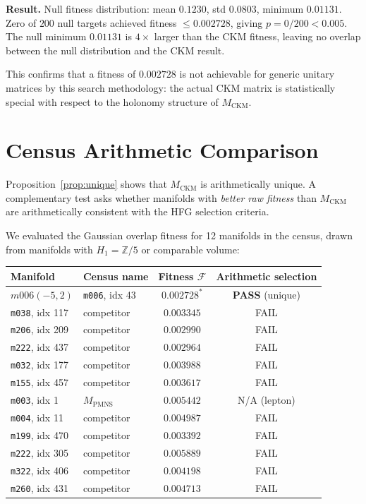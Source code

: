 \documentclass[11pt,a4paper]{article}
\theoremstyle{remark}
\newcommand{\MCKM}{M_{\mathrm{CKM}}}
\newcommand{\MPMNS}{M_{\mathrm{PMNS}}}
\newcommand{\Zfive}{\mathbb{Z}/5}
\begin{document}
\textbf{Result.}
Null fitness distribution: mean $0.1230$, std $0.0803$, minimum $0.01131$.
Zero of $200$ null targets achieved fitness $\leq 0.002728$,
giving \emph{$p = 0/200 < 0.005$}.
The null minimum $0.01131$ is $4\times$ larger than the CKM fitness,
leaving no overlap between the null distribution and the CKM result.

This confirms that a fitness of $0.002728$ is not
achievable for generic unitary matrices by this search methodology:
the actual CKM matrix is statistically special with respect to the
holonomy structure of $\MCKM$.

\section{Census Arithmetic Comparison}
\label{sec:census}

Proposition~\ref{prop:unique} shows that $\MCKM$ is arithmetically
unique.
A complementary test asks whether manifolds with \emph{better raw fitness}
than $\MCKM$ are arithmetically consistent with the HFG selection criteria.

We evaluated the Gaussian overlap fitness for 12 manifolds in the
census, drawn from manifolds with $H_1 = \Zfive$ or comparable
volume:

\begin{center}
\begin{tabular}{llcc}
\toprule
Manifold & Census name & Fitness $\mathcal{F}$ & Arithmetic selection \\
\midrule
$m006(-5,2)$ & \texttt{m006}, idx 43  & $0.002728^*$ & \textbf{PASS} (unique) \\
\texttt{m038}, idx 117 & competitor & $0.003345$ & FAIL \\
\texttt{m206}, idx 209 & competitor & $0.002990$ & FAIL \\
\texttt{m222}, idx 437 & competitor & $0.002964$ & FAIL \\
\texttt{m032}, idx 177 & competitor & $0.003988$ & FAIL \\
\texttt{m155}, idx 457 & competitor & $0.003617$ & FAIL \\
\texttt{m003}, idx 1   & $\MPMNS$ & $0.005442$ & N/A (lepton) \\
\texttt{m004}, idx 11  & competitor & $0.004987$ & FAIL \\
\texttt{m199}, idx 470 & competitor & $0.003392$ & FAIL \\
\texttt{m222}, idx 305 & competitor & $0.005889$ & FAIL \\
\texttt{m322}, idx 406 & competitor & $0.004198$ & FAIL \\
\texttt{m260}, idx 431 & competitor & $0.004713$ & FAIL \\
\bottomrule
\end{tabular}
\end{center}
\end{document}
